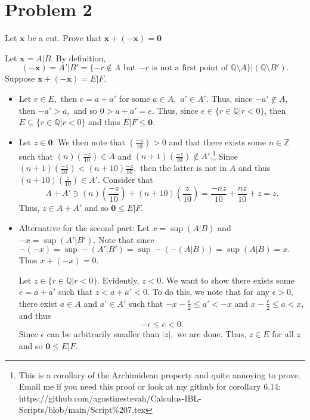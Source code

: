 \documentclass[11pt]{article}
\newcommand{\bbQ}{\mathbb{Q}}
\newcommand{\bbZ}{\mathbb{Z}}
\newcommand{\sm}{\setminus}
\begin{document}
\newpage
	
	\section*{Problem 2}
	\begin{problem}
		Let $\textbf{x}$ be a cut. Prove that $\textbf{x} + (-\textbf{x}) = \textbf{0}$
	\end{problem}
		\begin{solution}	
  Let $\textbf{x} = A | B.$ By definition, \[(-\textbf{x}) = A' | B' = \{-r \notin A\text{ but } {-r} \text{ is not a first point of }\bbQ \setminus A\}  | (\bbQ \sm B').\] Suppose $\textbf{x} + (-\textbf{x}) = E | F.$
  \begin{itemize}
      \item Let $e \in E,$ then $e = a + a'$ for some $a\in A,$ $a'\in A'.$ Thus, since $-a' \notin A,$ then $-a' >a,$ and so $0>a + a' = e.$ Thus, since $e \in \{r\in \bbQ | r<0\}$, then $E \subseteq \{r\in \bbQ | r<0\}$ and thus $E | F \leq \textbf{0}.$
      
      \item Let $z\in \textbf{0}.$ We then note that $(\frac{-z}{10})>0$ and that there exists some $n\in \bbZ$ such that $(n)(\frac{-z}{10})\in A$ and $(n+1)(\frac{-z}{10})\notin A'.$\footnote{This is a corollary of the Archimidean property and quite annoying to prove. Email me if you need this proof or look at my github for corollary 6.14: https://github.com/agustinestevah/Calculus-IBL-Scripts/blob/main/Script\%207.tex} Since $(n+1)(\frac{-z}{10})<(n+10)\frac{-z}{10},$ then the latter is not in $A$ and thus $(n+10)(\frac{z}{10})\in A'.$ Consider that
      \[A + A' \ni (n)(\frac{-z}{10})+ (n+10)(\frac{z}{10}) = \frac{-nz}{10}+ \frac{nz}{10} + z = z.\] Thus, $z\in A + A'$ and so $\textbf{0}\leq E | F.$
      
      
      \item Alternative for the second part: Let $x = \sup (A | B)$ and $-x = \sup (A' | B').$ Note that since $-(-x) = \sup -(A' | B') = \sup -(-(A | B)) = \sup(A | B) = x.$ Thus $x + (-x) = 0.$
      
      
      Let $z \in \{r\in \bbQ | r < 0\}.$ Evidently, $z<0.$ We want to show there exists some $e = a + a'$ such that $z< a + a' <0.$ To do this, we note that for any $\epsilon>0,$ there exist $a \in A$ and $a' \in A'$ such that $-x - \frac{\epsilon}{2} \leq a' < -x$ and $x-\frac{\epsilon}{2} \leq a < x,$ and thus \[-\epsilon \leq e <0.\] Since $\epsilon$ can be arbitrarily smaller than $|z|,$ we are done. Thus, $z \in E$ for all $z$ and so $\textbf{0} \leq E | F.$
  \end{itemize}
		\end{solution}
		\begin{reflection} 
		\end{reflection}
  \newpage
\end{document}
